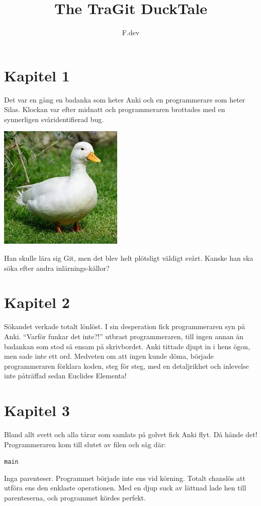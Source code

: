 \documentclass[a4paper]{article}
\begin{document}
\title{The TraGit DuckTale}
\author{F.dev}
\maketitle

\section*{Kapitel 1}
Det var en gång en badanka som heter Anki och en programmerare som heter Silas.
Klockan var efter midnatt och programmeraren brottades med en synnerligen svåridentifierad bug.

\begin{center}
	\includegraphics[scale=0.3]{duck.jpeg}
\end{center}

Han skulle lära sig Git, men det blev helt plötsligt väldigt svårt. Kanske han ska söka efter andra inlärnings-källor?

\section*{Kapitel 2}
Sökandet verkade totalt lönlöst. I sin desperation fick programmeraren syn på Anki.
``Varför funkar det inte?!'' utbrast programmeraren, till ingen annan än badankan som stod så ensam på skrivbordet.
Anki tittade djupt in i hens ögon, men sade inte ett ord. Medveten om att ingen kunde döma, började programmeraren förklara koden, steg för steg, med en detaljrikhet och inlevelse inte påträffad sedan Euclides Elementa!

\section*{Kapitel 3}
Bland allt svett och alla tårar som samlats på golvet fick Anki flyt. Då hände det! Programmeraren kom till slutet av filen och såg där:

\texttt{main}

Inga parenteser. Programmet började inte ens vid körning. Totalt chanslös att utföra ens den enklaste operationen. Med en djup suck av lättnad lade hen till parenteserna, och programmet kördes perfekt.
\end{document}
